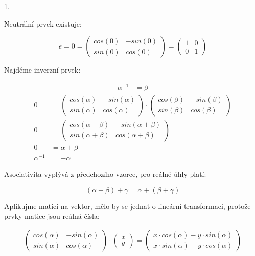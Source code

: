 \documentclass[10pt,a4paper]{article}
\begin{document}
1. 

Neutrální prvek existuje:

\begin{equation*}
e = 0 =
\begin{pmatrix}
cos(0) & -sin(0) \\
sin(0) & cos(0)
\end{pmatrix} 
=
\begin{pmatrix}
1 & 0 \\
0 & 1
\end{pmatrix} 
\end{equation*}

Najděme inverzní prvek:

\begin{align*}
\alpha^{-1} &= \beta 
\end{align*}
\begin{align*}
0 &=
\begin{pmatrix}
cos(\alpha) & -sin(\alpha) \\
sin(\alpha) & cos(\alpha)
\end{pmatrix} 
\cdot
\begin{pmatrix}
cos(\beta) & -sin(\beta) \\
sin(\beta) & cos(\beta)
\end{pmatrix} \\
0 &=
\begin{pmatrix}
cos(\alpha + \beta) 	& -sin(\alpha + \beta) \\
sin(\alpha + \beta)	&  cos(\alpha + \beta)
\end{pmatrix} \\
0 &= \alpha + \beta\\
\alpha^{-1} &= -\alpha
\end{align*}

Asociativita vyplývá z předchozího vzorce, pro reálné úhly platí:

\begin{equation*}
(\alpha + \beta) + \gamma = \alpha + (\beta + \gamma)
\end{equation*}

Aplikujme matici na vektor, mělo by se jednat o lineární transformaci, protože prvky matice jsou reálná čísla:

\begin{align*}
\begin{pmatrix}
cos(\alpha) & -sin(\alpha) \\
sin(\alpha) & cos(\alpha)
\end{pmatrix} 
\cdot
\begin{pmatrix}
x  \\
y
\end{pmatrix} 
=
\begin{pmatrix}
x \cdot cos(\alpha) - y \cdot sin(\alpha) \\
x \cdot sin(\alpha) - y \cdot cos(\alpha)
\end{pmatrix} 
\end{align*}
\end{document}
